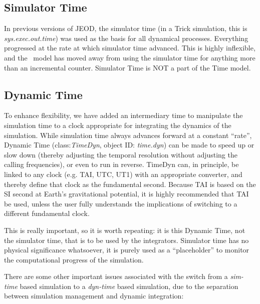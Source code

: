 \subsection{Simulator Time}
In previous versions of JEOD, the simulator time (in a Trick simulation,
this is \textit{sys.exec.out.time}) was used as the basis for all
dynamical processes.  Everything progressed at the rate at which
simulator time advanced.  This is highly inflexible, and the \JEODid\
model has moved away from using the simulator time for anything more
than an incremental counter.  Simulator Time is NOT a part of the Time
model.

\subsection{Dynamic Time}
To enhance flexibility, we have added an intermediary time to manipulate
the simulation time to a clock appropriate for integrating the dynamics
of the simulation.  While simulation time always advances forward at a
constant {\textquotedblleft}rate{\textquotedblright}, Dynamic Time
(class:\textit{TimeDyn}, object ID: \textit{time.dyn}) can be made to
speed up or slow down (thereby adjusting the temporal resolution
without adjusting the calling frequencies), or even to run in reverse. 
TimeDyn can, in principle, be linked to any clock (e.g. TAI, UTC, UT1)
with an appropriate converter, and thereby define that clock as the
fundamental second.  Because TAI is based on the SI second at
Earth's gravitational potential, it is highly
recommended that TAI be used, unless the user fully understands the
implications of switching to a different fundamental clock.




This is really important, so it is worth repeating: it is this Dynamic
Time, not the simulator time, that is to be used by the integrators. 
Simulator time has no physical significance whatsoever, it is purely
used as a {\textquotedblleft}placeholder{\textquotedblright} to monitor
the computational progress of the simulation.




There are some other important issues associated with the switch from a
\textit{sim-time} based simulation to a \textit{dyn-time} based
simulation, due to the separation between simulation management and
dynamic integration:


